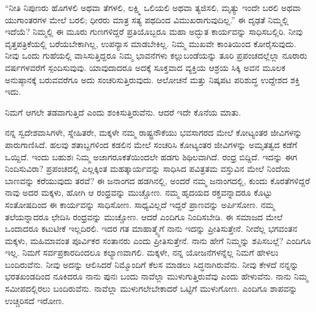 \newpage

“ನೀತಿ ನಿಪುಣರು ಹೊಗಳಲಿ ಅಥವಾ ತೆಗಳಲಿ, ಲಕ್ಷ್ಮಿ ಒಲಿಯಲಿ ಅಥವಾ ತ್ಯಜಿಸಲಿ, ಮೃತ್ಯು ಇಂದೇ ಬರಲಿ ಅಥವಾ ಯುಗಾಂತರಗಳ ಮೇಲೆ ಬರಲಿ; ಧೀರರು ಮಾತ್ರ ಸತ್ಯ ಪಥದಿಂದ ವಿಮುಖರಾಗುವುದಿಲ್ಲ.” ಈ ದೃಢತೆ ನಿಮ್ಮಲ್ಲಿ ಇದೆಯೆ? ನಿಮ್ಮಲ್ಲಿ ಈ ಮೂರು ಗುಣಗಳಿದ್ದರೆ ಪ್ರತಿಯೊಬ್ಬರೂ ಮಹಾ ಅದ್ಭುತ ಕಾರ್ಯವನ್ನು ಸಾಧಿಸಬಲ್ಲಿರಿ. ನೀವು ವೃತ್ತಪತ್ರಿಕೆಯಲ್ಲಿ ಬರೆಯಬೇಕಾಗಿಲ್ಲ, ಉಪನ್ಯಾಸ ಮಾಡಬೇಕಿಲ್ಲ. ನಿಮ್ಮ ಮುಖವೇ ಕಾಂತಿಯಿಂದ ಕೋರೈಸುವುದು. ನೀವು ಒಂದು ಗುಹೆಯಲ್ಲಿ ವಾಸಿಸುತ್ತಿದ್ದರೂ ನಿಮ್ಮ ಭಾವನೆಗಳು ಕಲ್ಲು\-ಬಂಡೆಯನ್ನು ತೂರಿ ಪ್ರಪಂಚದಲ್ಲೆಲ್ಲಾ ನೂರಾರು ವರ್ಷಗಳವರೆಗೆ ಸ್ಪಂದಿಸುವುವು. ಯಾವುದಾದರೂ ಅದಕ್ಕೆ ಸೂಕ್ತವಾದ ವ್ಯಕ್ತಿಯ ಆಶ್ರಯ ಸಿಕ್ಕಿ ಅವನ ಮೂಲಕ ಅನುಷ್ಠಾನಕ್ಕೆ ಬರುವವರೆಗೂ ಅದು ಸಂಚರಿಸುತ್ತಿರುವುದು. ಆಲೋಚನೆ ಮತ್ತು ನಿಷ್ಕಪಟ ಪರಿಶುದ್ಧ ಉದ್ದೇಶದ ಶಕ್ತಿ ಇದು.

ನಿಮಗೆ ಆಗಲೇ ತಡವಾಗುತ್ತಿದೆ ಎಂದು ಶಂಕಿಸುತ್ತಿರುವೆನು. ಆದರೆ ಇದೇ ಕೊನೆಯ ಮಾತು.

ನನ್ನ ಸ್ವದೇಶವಾಸಿಗಳೇ, ಸ್ನೇಹಿತರೇ, ಮಕ್ಕಳೇ ನಮ್ಮ ರಾಷ್ಟ್ರನೌಕೆಯು ಭವಸಾಗರದ ಮೇಲೆ ಕೋಟ್ಯಂತರ ಜೀವಿಗಳನ್ನು ಪಾರುಗಾಣಿಸಿದೆ. ಹಲವು ಶತಾಬ್ದಗಳಿಂದ ಕಡಲಿನ ಮೇಲೆ ಸಂಚರಿಸಿ ಕೋಟ್ಯಂತರ ಜೀವಿಗಳನ್ನು ಅಮೃತತ್ವದ ಕಡೆಗೆ ಒಯ್ದಿದೆ. ಇಂದು ಬಹುಶಃ ನಿಮ್ಮ ಅಜಾಗರೂಕತೆಯಿಂದಲೇ ಹಡಗು ಶಿಥಿಲವಾಗಿದೆ. ರಂಧ್ರ ಬಿದ್ದಿದೆ. ಇದನ್ನು ಈಗ ನಿಂದಿಸುವಿರಾ? ಪ್ರಪಂಚದಲ್ಲಿ ಎಲ್ಲಕ್ಕಿಂತ ಮಹತ್ಕಾರ್ಯವನ್ನು ಸಾಧಿಸಿದ ಪವಿತ್ರತಮ ವಸ್ತುವಿನ ಮೇಲೆ ನಿಂದೆಯ ಬಾಣವನ್ನು ಕರೆಯುವುದು ತರವೆ? ಈ ಜನಾಂಗದ ಹಡಗಿನಲ್ಲಿ, ಅಂದರೆ ನಮ್ಮ ಜನಾಂಗದಲ್ಲಿ, ಕುಂದು ಕೊರತೆಗಳಿದ್ದರೆ ನಾವು ಅದರ ಮಕ್ಕಳು, ಹೋಗಿ ಆ ರಂಧ್ರವನ್ನು ಮುಚ್ಚೋಣ. ನಮ್ಮ ಹೃದಯದ ರಕ್ತವನ್ನಾದರೂ ಕೊಟ್ಟು ಸಂತೋಷದಿಂದ ಈ ಕಾರ್ಯವನ್ನು ಸಾಧಿಸೋಣ. ಸಾಧ್ಯವಿಲ್ಲದೆ ಇದ್ದರೆ ಪ್ರಾಣವನ್ನು ಅರ್ಪಿಸೋಣ. ನಮ್ಮ ತಲೆಯನ್ನಾದರೂ ಛೇದಿಸಿ ರಂಧ್ರವನ್ನು ಮುಚ್ಚೋಣ. ಆದರೆ ಎಂದಿಗೂ ನಿಂದಿಸಬೇಡಿ. ಈ ಸಮಾಜದ ಮೇಲೆ ಒಂದಾದರೂ ಕಟುಟೀಕೆ ಇಲ್ಲದಿರಲಿ. ಇದರ ಗತ ಮಾಹಾತ್ಮ್ಯೆಗೆ ನಾನು ಇದನ್ನು ಪ್ರೀತಿಸುತ್ತೇನೆ. ನೀವೆಲ್ಲ ಭಗವಂತನ ಮಕ್ಕಳು, ಮಹಿಮಾವಂತ ಪೂರ್ವಿಕರ ಸಂತಾನರು ಎಂದು ಪ್ರೀತಿಸುತ್ತೇನೆ. ನಾನು ಹೇಗೆ ನಿಮ್ಮನ್ನು ಶಪಿಸಬಲ್ಲೆ? ಎಂದಿಗೂ ಇಲ್ಲ. ನಿಮಗೆ ಸರ್ವಪ್ರಕಾರದಿಂದಲೂ ಕಲ್ಯಾಣವಾಗಲಿ. ಮಕ್ಕಳೇ, ನನ್ನ ಯೋಜನೆಗಳನ್ನೆಲ್ಲ ನಿಮಗೆ ಹೇಳಲು ಬಂದಿರುವೆನು. ನೀವು ಅದನ್ನು ಆಲಿಸಿದರೆ ನಿಮ್ಮೊಂದಿಗೆ ಕೆಲಸ ಮಾಡಲು ಸಿದ್ಧನಾಗಿರುವೆನು. ನೀವು ಕೇಳದೆ ನನ್ನನ್ನು ಭರತಖಂಡದಿಂದ ನೂಕಿದರೂ ನಾನು ಪುನಃ ಬಂದು ನಾವೆಲ್ಲಾ ಮುಳುಗುತ್ತಿರುವೆವು ಎಂದು ಹೇಳುವೆನು. ನಾನು ನಿಮ್ಮ ಸಮೀಪದಲ್ಲಿರಲು ಬಂದಿರುವೆನು. ನಾವೆಲ್ಲಾ ಮುಳುಗಲೇಬೇಕಾದರೆ ಒಟ್ಟಿಗೆ ಮುಳುಗೋಣ. ಎಂದಿಗೂ ಶಾಪವನ್ನು ಉಚ್ಚರಿಸದೆ ಇರೋಣ.

